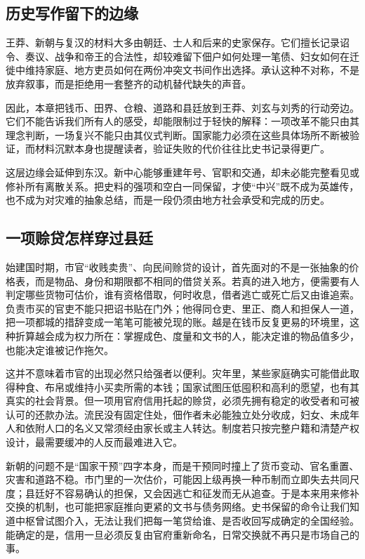 \subsection{历史写作留下的边缘}

王莽、新朝与复汉的材料大多由朝廷、士人和后来的史家保存。它们擅长记录诏令、奏议、战争和帝王的合法性，却较难留下佃户如何处理一笔债、妇女如何在迁徙中维持家庭、地方吏员如何在两份冲突文书间作出选择。承认这种不对称，不是放弃叙事，而是拒绝用一套整齐的动机替代缺失的声音。

因此，本章把钱币、田界、仓粮、道路和县廷放到王莽、刘玄与刘秀的行动旁边。它们不能告诉我们所有人的感受，却能限制过于轻快的解释：一项改革不能只由其理念判断，一场复兴不能只由其仪式判断。国家能力必须在这些具体场所不断被验证，而材料沉默本身也提醒读者，验证失败的代价往往比史书记录得更广。

这层边缘会延伸到东汉。新中心能够重建年号、官职和交通，却未必能完整看见或修补所有离散关系。把史料的强项和空白一同保留，才使“中兴”既不成为英雄传，也不成为对灾难的抽象总结，而是一段仍须由地方社会承受和完成的历史。

\subsection{一项赊贷怎样穿过县廷}

始建国时期，市官“收贱卖贵”、向民间赊贷的设计，首先面对的不是一张抽象的价格表，而是物品、身份和期限都不相同的借贷关系。若真的进入地方，便需要有人判定哪些货物可估价，谁有资格借取，何时收息，借者逃亡或死亡后又由谁追索。负责市买的官吏不能只把诏书贴在门外；他得同仓吏、里正、商人和担保人一道，把一项都城的措辞变成一笔笔可能被兑现的账。越是在钱币反复更易的环境里，这种折算越会成为权力所在：掌握成色、度量和文书的人，能决定谁的物品值多少，也能决定谁被记作拖欠。

这并不意味着市官的出现必然只给强者以便利。灾年里，某些家庭确实可能借此取得种食、布帛或维持小买卖所需的本钱；国家试图压低囤积和高利的愿望，也有其真实的社会背景。但一项用官府信用托起的赊贷，必须先拥有稳定的收受者和可被认可的还款办法。流民没有固定住处，佃作者未必能独立处分收成，妇女、未成年人和依附人口的名义又常须经由家长或主人转达。制度若只按完整户籍和清楚产权设计，最需要缓冲的人反而最难进入它。

新朝的问题不是“国家干预”四字本身，而是干预同时撞上了货币变动、官名重置、灾害和道路不稳。市门里的一次估价，可能因上级再换一种币制而立即失去共同尺度；县廷好不容易确认的担保，又会因逃亡和征发而无从追查。于是本来用来修补交换的机制，也可能把家庭推向更紧的文书与债务网络。史书保留的命令让我们知道中枢曾试图介入，无法让我们把每一笔贷给谁、是否收回写成确定的全国经验。能确定的是，信用一旦必须反复由官府重新命名，日常交换就不再只是市场自己的事。

